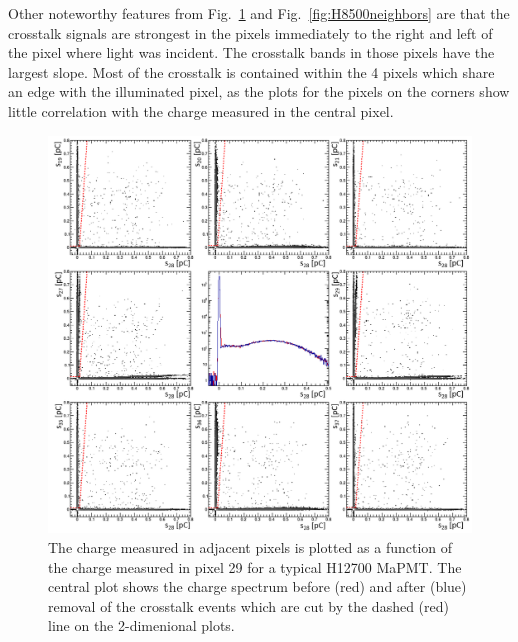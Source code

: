 Other noteworthy features from Fig.~\ref{fig:H12700neighbors} and Fig.~\ref{fig:H8500neighbors} are that the crosstalk signals are strongest in the pixels immediately to the right and left of the pixel where light was incident. The crosstalk bands in those pixels have the largest slope. Most of the crosstalk is contained within the 4 pixels which share an edge with the illuminated pixel, as the plots for the pixels on the corners show little correlation with the charge measured in the central pixel.

\begin{figure}[hbt]
	\centering
	\includegraphics[width=\linewidth]{figures/H12700_ct.png}
	\caption{The charge measured in adjacent pixels is plotted as a function of the charge measured in pixel 29 for a typical H12700 MaPMT. The central plot shows the charge spectrum before (red) and after (blue) removal of the crosstalk events which are cut by the dashed (red) line on the 2-dimenional plots.}
	\label{fig:H12700neighbors}
\end{figure}
